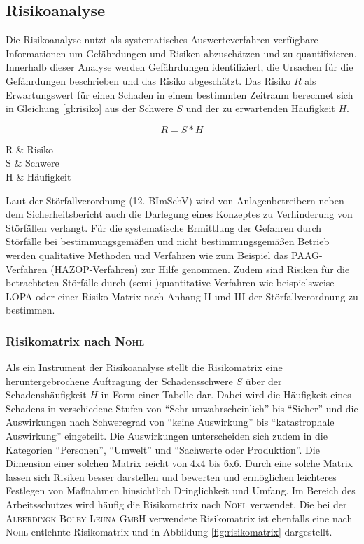 \subsection{Risikoanalyse}
Die Risikoanalyse nutzt als systematisches Auswerteverfahren verfügbare Informationen um Gefährdungen und Risiken abzuschätzen und zu quantifizieren. Innerhalb dieser Analyse werden Gefährdungen identifiziert, die Ursachen für die Gefährdungen beschrieben und das Risiko abgeschätzt. Das Risiko $R$ als Erwartungswert für einen Schaden in einem bestimmten Zeitraum berechnet sich in Gleichung \eqref{gl:risiko} aus der Schwere $S$ und der zu erwartenden Häufigkeit $H$. \cite{Neumann.2010}

\begin{equation}
	\label{gl:risiko}
	R = S*H
\end{equation}
\begin{parameter}
	R 		& Risiko \\
	S 		& Schwere\\
	H 		& Häufigkeit\\
\end{parameter}

Laut der Störfallverordnung (12. BImSchV) wird von Anlagenbetreibern neben dem Sicherheitsbericht auch die Darlegung eines Konzeptes zu Verhinderung von Störfällen verlangt. Für die systematische Ermittlung der Gefahren durch Störfälle bei bestimmungsgemäßen und nicht bestimmungsgemäßen Betrieb werden qualitative Methoden und Verfahren wie zum Beispiel das PAAG-Verfahren (HAZOP-Verfahren) zur Hilfe genommen. Zudem sind Risiken für die betrachteten Störfälle durch (semi-)quantitative Verfahren wie beispielsweise LOPA oder einer Risiko-Matrix nach Anhang II und III der Störfallverordnung zu bestimmen. \cite{Neumann.2010c}


\subsubsection{Risikomatrix nach \textsc{Nohl}}
Als ein Instrument der Risikoanalyse stellt die Risikomatrix eine heruntergebrochene Auftragung der Schadensschwere $S$ über der Schadenshäufigkeit $H$ in Form einer Tabelle dar. Dabei wird die Häufigkeit eines Schadens in verschiedene Stufen von "`Sehr unwahrscheinlich"' bis "`Sicher"' und die Auswirkungen nach Schweregrad von "`keine Auswirkung"' bis "`katastrophale Auswirkung"' eingeteilt. Die Auswirkungen unterscheiden sich zudem in die Kategorien "`Personen"', "`Umwelt"' und "`Sachwerte oder Produktion"'. Die Dimension einer solchen Matrix reicht von 4x4 bis 6x6. Durch eine solche Matrix lassen sich Risiken besser darstellen und bewerten und ermöglichen leichteres Festlegen von Maßnahmen hinsichtlich Dringlichkeit und Umfang. Im Bereich des Arbeitsschutzes wird häufig die Risikomatrix nach \textsc{Nohl} verwendet. \cite{Neumann.2010b}\linebreak
Die bei der \textsc{Alberdingk Boley Leuna GmbH} verwendete Risikomatrix ist ebenfalls eine nach \textsc{Nohl} entlehnte Risikomatrix und in Abbildung \ref{fig:risikomatrix} dargestellt. 

